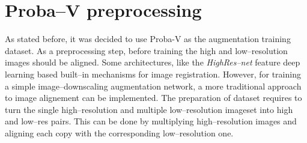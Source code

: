 \section{Proba--V preprocessing}
As stated before, it was decided to use Proba-V as the augmentation training dataset.
As a preprocessing step, before training the high and low--resolution images should be aligned.
Some architectures, like the \textit{HighRes--net} feature deep learning based built--in mechanisms for image registration.
However, for training a simple image--downscaling augmentation network, a more traditional approach to image alignement can be implemented.
The preparation of dataset requires to turn the single high--resolution and multiple low--resolution imageset into high and low--res pairs.
This can be done by multiplying high--resolution images and aligning each copy with the corresponding low--resolution one.


